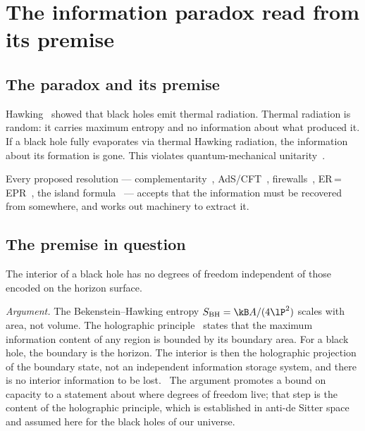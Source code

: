 \section{The information paradox read from its premise}\label{sec:bi_paradox}
\subsection{The paradox and its premise}
Hawking~\cite{Hawking1975} showed that black holes emit thermal radiation. Thermal radiation is random: it carries maximum entropy and no information about what produced
it. If a black hole fully evaporates via thermal Hawking radiation, the information about its formation is gone. This violates quantum-mechanical
unitarity~\cite{Hawking1976}.

Every proposed resolution --- complemen\-tarity~\cite{SusskindThorlaciusUglum1993}, AdS/CFT~\cite{Maldacena1998}, firewalls~\cite{AMPS2013}, ER\,=\,EPR~\cite{MaldacenaSusskind2013}, the island
formula~\cite{Penington2020,Almheiri2020} --- accepts that the information must be recovered from somewhere, and works out machinery to extract it. \interp

\subsection{The premise in question}
\begin{keybox}[title={Proposition (no interior degrees of freedom) --- conjecture}]
The interior of a black hole has no degrees of freedom independent of those encoded on the horizon surface.
\end{keybox}
\emph{Argument.} The Bekenstein--Hawking entropy $S_{\rm BH}=\kB A/(4\lP^2)$ scales with area, not volume. The holographic principle~\cite{tHooft1993} states that the maximum
information content of any region is bounded by its boundary area. For a black hole, the boundary is the horizon. The interior is then the holographic
projection of the boundary state, not an independent information storage system, and there is no interior information to be lost. \conjecture\ The
argument promotes a bound on capacity to a statement about where degrees of freedom live; that step is the content of the holographic principle, which
is established in anti-de Sitter space~\cite{Maldacena1998} and assumed here for the black holes of our universe.

